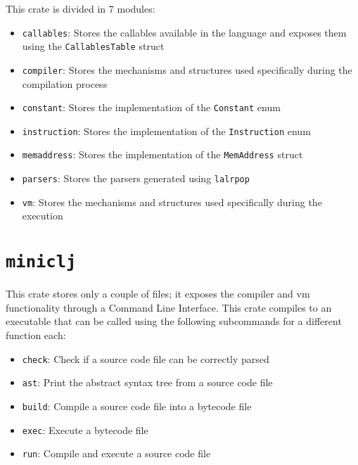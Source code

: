 \documentclass[11pt]{scrreprt}
\begin{document}
This crate is divided in 7 modules:
\begin{itemize}
  \item \texttt{callables}: Stores the callables available in the language and exposes them using the \texttt{CallablesTable} struct
  \item \texttt{compiler}: Stores the mechanisms and structures used specifically during the compilation process
  \item \texttt{constant}: Stores the implementation of the \texttt{Constant} enum
  \item \texttt{instruction}: Stores the implementation of the \texttt{Instruction} enum
  \item \texttt{memaddress}: Stores the implementation of the \texttt{MemAddress} struct
  \item \texttt{parsers}: Stores the parsers generated using \texttt{lalrpop}
  \item \texttt{vm}: Stores the mechanisms and structures used specifically during the execution
\end{itemize}

\section{\texttt{miniclj}}
This crate stores only a couple of files; it exposes the compiler and vm functionality through a Command Line Interface. This crate compiles to an executable that can be called using the following subcommands for a different function each:
\begin{itemize}
  \item \texttt{check}: Check if a source code file can be correctly parsed
  \item \texttt{ast}: Print the abstract syntax tree from a source code file
  \item \texttt{build}: Compile a source code file into a bytecode file
  \item \texttt{exec}: Execute a bytecode file
  \item \texttt{run}: Compile and execute a source code file
\end{itemize}
\end{document}
